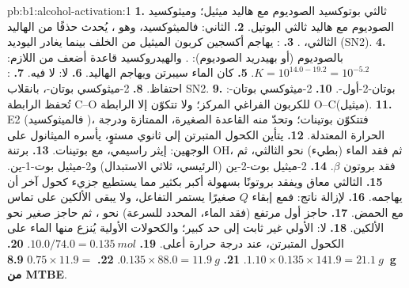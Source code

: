 \begin{solution}{pb:b1:alcohol-activation:1}
\textbf{1.} ثالثي بوتوكسيد الصوديوم مع هاليد ميثيل؛ وميثوكسيد الصوديوم مع
هاليد ثالثي البوتيل.
\textbf{2.} الثاني: فالميثوكسيد، وهو ، يُحدث حذفًا من
الهاليد الثالثي، .
\textbf{3.} : يهاجم أكسجين 
كربون الميثيل من الخلف بينما يغادر اليوديد (SN2).
\textbf{4.} بالصوديوم (أو بهيدريد الصوديوم): . والهيدروكسيد قاعدة أضعف من اللازم: $K = 10^{14.0 -
19.2} = 10^{-5.2}$.
\textbf{5.} كان الماء سيبرتن  ويهاجم الهاليد.
\textbf{6.} لا: لا  فيه.
\textbf{7.} :
احتفاظ.
\textbf{8.} 2-ميثوكسي بوتان-، بانقلاب SN2.
\textbf{9.} بوتان-2-أول-.
\textbf{10.} 2-ميثوكسي بوتان-: تُحفظ الرابطة C--O للكربون
الفراغي المركز؛ ولا تتكوّن إلا الرابطة O--C(ميثيل).
\textbf{11.} E2 (فالميثوكسيد  )،
فتتكوّن بوتينات؛ وتحدّ منه القاعدة الصغيرة،  الممتازة
ودرجة الحرارة المعتدلة.
\textbf{12.} يتأين الكحول المتبرتن إلى  ثانوي مستوٍ،
يأسره الميثانول على الوجهين: إيثر راسيمي، مع
بوتينات.
\textbf{13.} برتنة OH، ثم فقد الماء (بطيء) نحو 
الثالثي، ثم فقد بروتون $\beta$.
\textbf{14.} 2-ميثيل بوت-2-ين (الرئيسي، ثلاثي الاستبدال)
و2-ميثيل بوت-1-ين.
\textbf{15.}  الثالثي معاق ويفقد بروتونًا بسهولة
أكبر بكثير مما يستطيع جزيء كحول آخر أن يهاجمه.
\textbf{16.} لإزالة ناتج: فمع إبقاء $Q$ صغيرًا يستمر التفاعل،
ولا يبقى الألكين على تماس مع الحمض.
\textbf{17.} حاجز أول مرتفع (فقد الماء، المحدد للسرعة) نحو
، ثم حاجز صغير نحو الألكين.
\textbf{18.} لا:  الأولي غير ثابت إلى حد كبير؛ والكحولات الأولية
يُنزع منها الماء  على الكحول المتبرتن، عند درجة حرارة أعلى.
\textbf{19.} $10.0/74.0 = \qty{0.135}{mol}$.
\textbf{20.} $1.10 \times 0.135 \times 141.9 = \qty{21.1}{g}$.
\textbf{21.} $0.135 \times 88.0 = \qty{11.9}{g}$.
\textbf{22.} $0.75 \times 11.9 =$ \textbf{\qty{8.9}{g} من MTBE}.
\end{solution}
